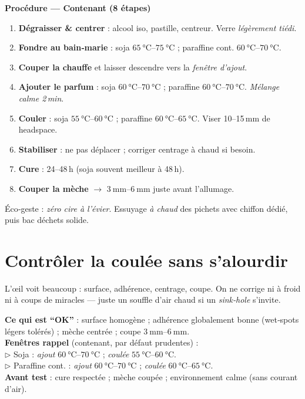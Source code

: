 \documentclass[../../main.tex]{subfiles}
\begin{document}
\begin{BlocEtapes}
\textbf{Procédure — Contenant (8 étapes)}
\begin{enumerate}[leftmargin=1.2em]
  \item \textbf{Dégraisser \& centrer} : alcool iso, pastille, centreur. Verre \textit{légèrement tiédi}.
  \item \textbf{Fondre au bain‑marie} : soja \(\SIrange{65}{75}{\celsius}\) ; paraffine cont. \(\SIrange{60}{70}{\celsius}\).
  \item \textbf{Couper la chauffe} et laisser descendre vers la \textit{fenêtre d’ajout}.
  \item \textbf{Ajouter le parfum} : soja \(\SIrange{60}{70}{\celsius}\) ; paraffine \(\SIrange{60}{70}{\celsius}\). \textit{Mélange calme 2\,min}.
  \item \textbf{Couler} : soja \(\SIrange{55}{60}{\celsius}\) ; paraffine \(\SIrange{60}{65}{\celsius}\). Viser 10--15\,mm de headspace.
  \item \textbf{Stabiliser} : ne pas déplacer ; corriger centrage à chaud si besoin.
  \item \textbf{Cure} : 24--48\,h (soja souvent meilleur à 48\,h).
  \item \textbf{Couper la mèche} \(\rightarrow\) \(\SIrange{3}{6}{\milli\meter}\) juste avant l’allumage.
\end{enumerate}
\end{BlocEtapes}

\begin{remark}
Éco‑geste : \textit{zéro cire à l’évier}. Essuyage \textit{à chaud} des pichets avec chiffon dédié, puis bac déchets solide.
\end{remark}

\section{Contrôler la coulée sans s’alourdir}

L’œil voit beaucoup : surface, adhérence, centrage, coupe. On ne corrige ni à froid ni à coups de miracles — juste un souffle d’air chaud si un \textit{sink‑hole} s’invite.

\begin{BlocControles}
\textbf{Ce qui est “OK”} : surface homogène ; adhérence globalement bonne (wet‑spots légers tolérés) ; mèche centrée ; coupe \(\SIrange{3}{6}{\milli\meter}\). \\
\textbf{Fenêtres rappel} (contenant, par défaut prudentes) : \\
\(\triangleright\) Soja : \textit{ajout} \(\SIrange{60}{70}{\celsius}\) ; \textit{coulée} \(\SIrange{55}{60}{\celsius}\). \\
\(\triangleright\) Paraffine cont. : \textit{ajout} \(\SIrange{60}{70}{\celsius}\) ; \textit{coulée} \(\SIrange{60}{65}{\celsius}\). \\
\textbf{Avant test} : cure respectée ; mèche coupée ; environnement calme (sans courant d’air).
\end{BlocControles}
\end{document}

